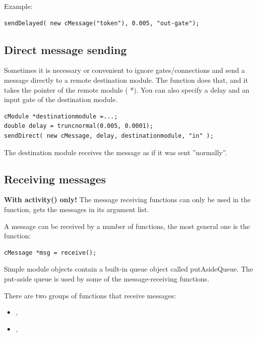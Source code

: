 Example:

\begin{verbatim}
sendDelayed( new cMessage("token"), 0.005, "out-gate");
\end{verbatim}






\subsection{Direct message sending}

Sometimes it is necessary or convenient to ignore gates/connections
and send a message directly to a remote destination module. The 
function does that, and it takes the pointer of the remote module
( *). You can also specify a delay and an input gate of
the destination module.

\begin{verbatim}
cModule *destinationmodule =...;
double delay = truncnormal(0.005, 0.0001);
sendDirect( new cMessage, delay, destinationmodule, "in" );
\end{verbatim}

The destination module receives the message as if it was sent
''normally''.



\subsection{Receiving messages}

\textbf{With activity() only!} The message receiving functions can
only be used in the  function,
 gets the messages in its argument list.

A message can be received by a number of functions, the most
general one is the  function:

\begin{verbatim}
cMessage *msg = receive();
\end{verbatim}

Simple module objects contain a built-in queue object called
putAsideQueue. The put-aside queue is used by
some of the message-receiving functions.

There are two groups of functions that receive messages:
\begin{itemize}
\item{, }
\item{, }
\end{itemize}


